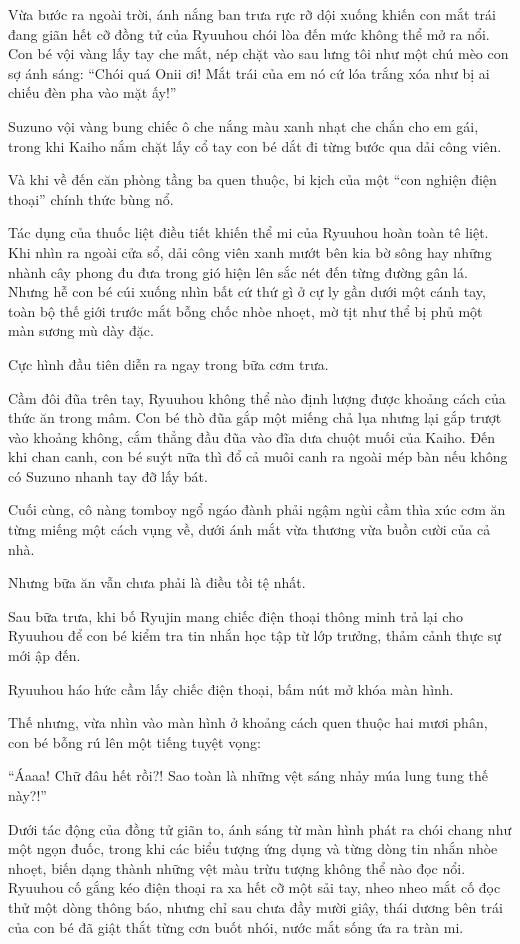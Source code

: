 \documentclass[../main.tex]{subfiles}
\begin{document}
Vừa bước ra ngoài trời, ánh nắng ban trưa rực rỡ dội xuống khiến con mắt trái đang giãn hết cỡ đồng tử của Ryuuhou chói lòa đến mức không thể mở ra nổi. Con bé vội vàng lấy tay che mắt, nép chặt vào sau lưng tôi như một chú mèo con sợ ánh sáng: ``Chói quá Onii ơi! Mắt trái của em nó cứ lóa trắng xóa như bị ai chiếu đèn pha vào mặt ấy!''

Suzuno vội vàng bung chiếc ô che nắng màu xanh nhạt che chắn cho em gái, trong khi Kaiho nắm chặt lấy cổ tay con bé dắt đi từng bước qua dải công viên.

Và khi về đến căn phòng tầng ba quen thuộc, bi kịch của một ``con nghiện điện thoại'' chính thức bùng nổ.

Tác dụng của thuốc liệt điều tiết khiến thể mi của Ryuuhou hoàn toàn tê liệt. Khi nhìn ra ngoài cửa sổ, dải công viên xanh mướt bên kia bờ sông hay những nhành cây phong đu đưa trong gió hiện lên sắc nét đến từng đường gân lá. Nhưng hễ con bé cúi xuống nhìn bất cứ thứ gì ở cự ly gần dưới một cánh tay, toàn bộ thế giới trước mắt bỗng chốc nhòe nhoẹt, mờ tịt như thể bị phủ một màn sương mù dày đặc.

Cực hình đầu tiên diễn ra ngay trong bữa cơm trưa.

Cầm đôi đũa trên tay, Ryuuhou không thể nào định lượng được khoảng cách của thức ăn trong mâm. Con bé thò đũa gắp một miếng chả lụa nhưng lại gắp trượt vào khoảng không, cắm thẳng đầu đũa vào đĩa dưa chuột muối của Kaiho. Đến khi chan canh, con bé suýt nữa thì đổ cả muôi canh ra ngoài mép bàn nếu không có Suzuno nhanh tay đỡ lấy bát.

Cuối cùng, cô nàng tomboy ngổ ngáo đành phải ngậm ngùi cầm thìa xúc cơm ăn từng miếng một cách vụng về, dưới ánh mắt vừa thương vừa buồn cười của cả nhà.

Nhưng bữa ăn vẫn chưa phải là điều tồi tệ nhất.

Sau bữa trưa, khi bố Ryujin mang chiếc điện thoại thông minh trả lại cho Ryuuhou để con bé kiểm tra tin nhắn học tập từ lớp trưởng, thảm cảnh thực sự mới ập đến.

Ryuuhou háo hức cầm lấy chiếc điện thoại, bấm nút mở khóa màn hình.

Thế nhưng, vừa nhìn vào màn hình ở khoảng cách quen thuộc hai mươi phân, con bé bỗng rú lên một tiếng tuyệt vọng:

``Áaaa! Chữ đâu hết rồi?! Sao toàn là những vệt sáng nhảy múa lung tung thế này?!''

Dưới tác động của đồng tử giãn to, ánh sáng từ màn hình phát ra chói chang như một ngọn đuốc, trong khi các biểu tượng ứng dụng và từng dòng tin nhắn nhòe nhoẹt, biến dạng thành những vệt màu trừu tượng không thể nào đọc nổi. Ryuuhou cố gắng kéo điện thoại ra xa hết cỡ một sải tay, nheo nheo mắt cố đọc thử một dòng thông báo, nhưng chỉ sau chưa đầy mười giây, thái dương bên trái của con bé đã giật thắt từng cơn buốt nhói, nước mắt sống ứa ra tràn mi.
\end{document}
